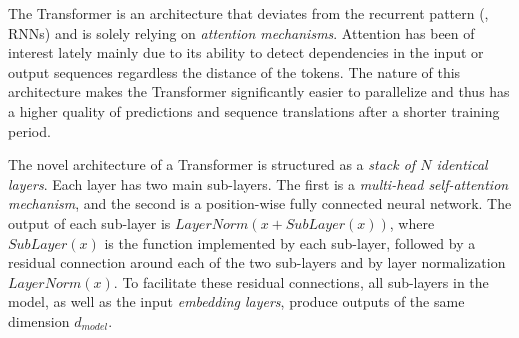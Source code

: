 
The Transformer is an \dnn architecture that deviates from the recurrent pattern
(\eg, RNNs) and is solely relying on \emph{attention mechanisms}. Attention has
been of interest lately \citep{Bahdanau2015, Kim2017, Vaswani_2017} mainly due
to its ability to detect dependencies in the input or output sequences
regardless the distance of the tokens. The nature of this architecture makes the
Transformer significantly easier to parallelize and thus has a higher
quality of predictions and sequence translations after a shorter training
period.

The novel architecture of a Transformer \citep{Vaswani_2017} is structured as a
\emph{stack of $N$ identical layers}. Each layer has two main sub-layers. The
first is a \emph{multi-head self-attention mechanism}, and the second is a
position-wise fully connected neural network. The output of each sub-layer is
$LayerNorm(x + SubLayer(x))$, where $SubLayer(x)$ is the function implemented by
each sub-layer, followed by a residual connection around each of the two
sub-layers and  by layer normalization $LayerNorm(x)$. To facilitate these
residual connections, all sub-layers in the model, as well as the input
\emph{embedding layers}, produce outputs of the same dimension $d_{model}$.


